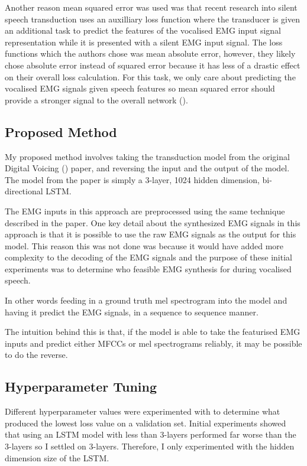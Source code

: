 Another
reason mean squared error was used was that recent research into
silent speech transduction uses an auxilliary loss function where the
transducer is given an additional task to predict the features of
the vocalised EMG input signal representation while it is presented
with a silent EMG input signal. The loss functions which the authors
chose was mean absolute error, however, they likely chose absolute
error instead of squared error because it has less of a drastic
effect on their overall loss calculation. For this task, we only
care about predicting the vocalised EMG signals given speech features
so mean squared error should provide a stronger signal to the overall
network (\cite{silent_speech_tonal}).

\subsection{Proposed Method}

My proposed method involves taking the transduction model from
the original Digital Voicing (\cite{gaddy2020digital}) paper,
and reversing the input and the output of the model.
The model from the paper is simply a 3-layer, 1024 hidden dimension,
bi-directional LSTM.

The EMG inputs in this approach are preprocessed
using the same technique described in the paper. One key detail
about the synthesized EMG signals in this approach is that it is
possible to use the raw EMG signals as the output for this model.
This reason this was not done was because it would have added
more complexity to the decoding of the EMG signals and the purpose
of these initial experiments was to determine who feasible EMG
synthesis for during vocalised speech.

In other words feeding in a ground truth mel spectrogram into the
model and having it predict the EMG signals, in a sequence to
sequence manner.

The intuition
behind this is that, if the model is able to take the featurised
EMG inputs and predict either MFCCs or mel spectrograms reliably,
it may be possible to do the reverse.

\subsection{Hyperparameter Tuning}

Different hyperparameter values were experimented with to determine what
produced the lowest loss value on a validation set. Initial experiments
showed that using an LSTM model with less than 3-layers performed
far worse than the 3-layers so I settled on 3-layers. Therefore, I only
experimented with the hidden dimension size of the LSTM.

